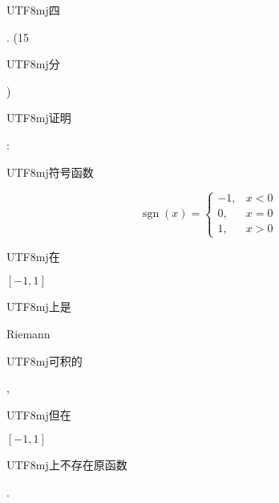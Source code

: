 \documentclass[10pt]{article}
\begin{document}
\begin{CJK}{UTF8}{mj}四\end{CJK}. (15 \begin{CJK}{UTF8}{mj}分\end{CJK}) \begin{CJK}{UTF8}{mj}证明\end{CJK}: \begin{CJK}{UTF8}{mj}符号函数\end{CJK}
$$
\operatorname{sgn}(x)= \begin{cases}-1, & x<0 \\ 0, & x=0 \\ 1, & x>0\end{cases}
$$
\begin{CJK}{UTF8}{mj}在\end{CJK} $[-1,1]$ \begin{CJK}{UTF8}{mj}上是\end{CJK} Riemann \begin{CJK}{UTF8}{mj}可积的\end{CJK}, \begin{CJK}{UTF8}{mj}但在\end{CJK} $[-1,1]$ \begin{CJK}{UTF8}{mj}上不存在原函数\end{CJK}.
\end{document}
